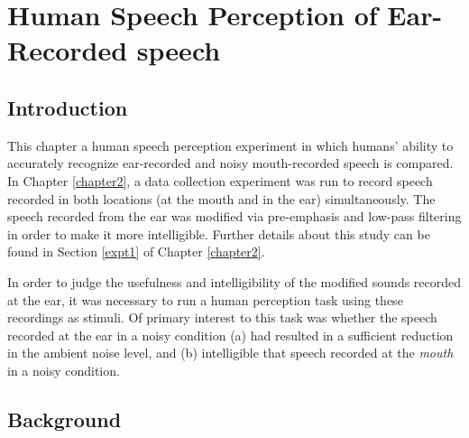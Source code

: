 % 
% 
% 

\chapter{Human Speech Perception of Ear-Recorded speech\label{chapter3}}


\section{Introduction}\label{chap3:introduction}

This chapter \DIFdelbegin {}\DIFdelend \DIFaddbegin {}\DIFaddend a human speech perception experiment in which humans' ability to accurately recognize ear-recorded and noisy mouth-recorded speech is compared.  In Chapter \ref{chapter2}, a data collection experiment was run to record speech recorded in both locations (at the mouth and in the ear) simultaneously.  The speech recorded from the ear was modified via pre-emphasis and low-pass filtering in order to make it more intelligible.  Further details about this study can be found in Section \ref{expt1} of Chapter \ref{chapter2}.

In order to judge the usefulness and intelligibility of the modified sounds recorded at the ear, it was necessary to run a human perception task using these recordings as stimuli.  Of primary interest to this task was whether the speech recorded at the ear in a noisy condition (a) had resulted in a sufficient reduction in the ambient noise level, and (b) \DIFdelbegin {}\DIFdelend \DIFaddbegin {}\DIFaddend intelligible that speech recorded at the \textit{mouth} in a noisy condition.

\section{Background}\label{chap3:background}

